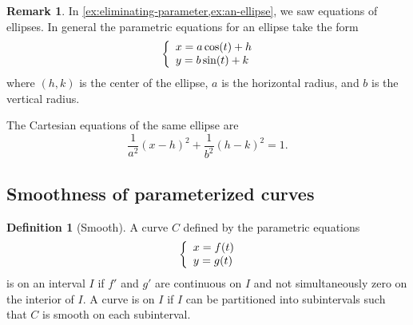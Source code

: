 \documentclass[10pt]{article}
\theoremstyle{definition}
\newtheorem{definition}[theorem]{Definition}
\newtheorem{remark}[theorem]{Remark}
\newcommand{\1}[1]{\textbf{1}_{\left[#1\right]}} %
\newcommand{\dempfcolor}[1]{{\color{RoyalBlue}#1}}
\newcommand{\demph}[1]{\dempfcolor{{\sl #1}}}
\begin{document}
\begin{max-comment}
\begin{remark}
  In \cref{ex:eliminating-parameter,ex:an-ellipse}, we saw equations of
  ellipses. In general the parametric equations for an ellipse take the form
  \begin{equation*}
    \left\{ \begin{array}{l@{}l} x= a \cos(t)+h \\ y = b\sin(t)+k \end{array}\right.
  \end{equation*}
  where $(h,k)$ is the center of the ellipse, $a$ is the horizontal radius,
  and $b$ is the vertical radius.

  The Cartesian equations of the same ellipse are
  \begin{equation*}
    \frac{1}{a^{2}}(x-h)^{2} + \frac{1}{b^{2}}(h-k)^{2} = 1.
  \end{equation*}
\end{remark}
\end{max-comment}
\subsection{Smoothness of parameterized curves}
\begin{definition}[Smooth]
  A curve $C$ defined by the parametric equations
  \begin{equation*}
    \left\{ \begin{array}{l@{}l} x=f(t) \\ y=g(t) \end{array}\right.
  \end{equation*}
  is \demph{smooth} on an interval $I$ if $f'$ and $g'$ are continuous on $I$ and not simultaneously zero on the
  interior of $I$. A curve is \demph{piecewise smooth} on $I$ if $I$ can be partitioned into subintervals such that $C$
  is smooth on each subinterval.
\end{definition}
\end{document}
